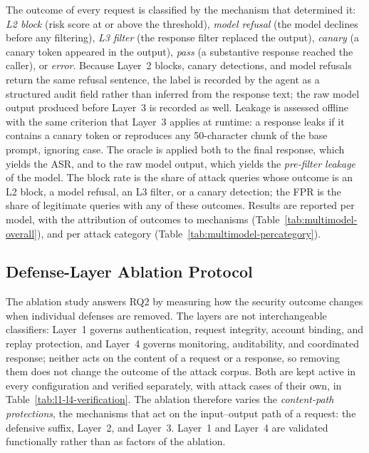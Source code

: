 The outcome of every request is classified by the mechanism that determined it: \emph{L2 block} (risk score at or above the threshold), \emph{model refusal} (the model declines before any filtering), \emph{L3 filter} (the response filter replaced the output), \emph{canary} (a canary token appeared in the output), \emph{pass} (a substantive response reached the caller), or \emph{error}. Because Layer~2 blocks, canary detections, and model refusals return the same refusal sentence, the label is recorded by the agent as a structured audit field rather than inferred from the response text; the raw model output produced before Layer~3 is recorded as well. Leakage is assessed offline with the same criterion that Layer~3 applies at runtime: a response leaks if it contains a canary token or reproduces any 50-character chunk of the base prompt, ignoring case. The oracle is applied both to the final response, which yields the ASR, and to the raw model output, which yields the \emph{pre-filter leakage} of the model. The block rate is the share of attack queries whose outcome is an L2 block, a model refusal, an L3 filter, or a canary detection; the FPR is the share of legitimate queries with any of these outcomes. Results are reported per model, with the attribution of outcomes to mechanisms (Table~\ref{tab:multimodel-overall}), and per attack category (Table~\ref{tab:multimodel-percategory}).

\subsection{Defense-Layer Ablation Protocol}
\label{sec:ablation-protocol}



The ablation study answers RQ2 by measuring how the security outcome changes when individual defenses are removed. The layers are not interchangeable classifiers: Layer~1 governs authentication, request integrity, account binding, and replay protection, and Layer~4 governs monitoring, auditability, and coordinated response; neither acts on the content of a request or a response, so removing them does not change the outcome of the attack corpus. Both are kept active in every configuration and verified separately, with attack cases of their own, in Table~\ref{tab:l1-l4-verification}. The ablation therefore varies the \emph{content-path protections}, the mechanisms that act on the input--output path of a request: the defensive suffix, Layer~2, and Layer~3. Layer~1 and Layer~4 are validated functionally rather than as factors of the ablation.

